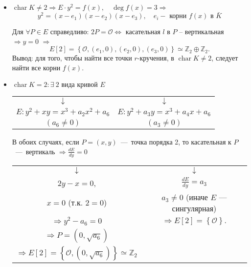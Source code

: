 \documentclass[12pt]{article}
\newcommand{\Z}{{{\mathbb Z}}}
\theoremstyle{definition}
\theoremstyle{definition}
\theoremstyle{definition}
\begin{document}
\begin{itemize}
	\item $\operatorname{char} K \ne 2 \Rightarrow E \cdot {y^2} = f\left( x \right),\quad \deg f\left( x \right) = 3 \Rightarrow $
	$$
	{y^2} = \left( {x - {e_1}} \right)\left( {x - {e_2}} \right)\left( {x - {e_3}} \right),\quad {e_i} - {\text{ корни }}f\left( x \right){\text{ в }}\bar{K}
	$$
	
	Для $\forall P \in E$ справедливо: $2P = \mathcal{O} \Leftrightarrow $ касательная $l$ в $P$ -- вертикальная $ \Rightarrow y = 0$ $ \Rightarrow $
	\[
	E[2] = \left\{ \mathcal{O}, (e_1,0), (e_2,0), (e_3,0) \right\} \simeq \Z_2 \oplus \Z_2.
	\]
	Вывод: для того, чтобы найти все точки $r$-кручения, в $\operatorname{char} K \ne 2$, следует найти все корни $f(x)$.
	\item $\operatorname{char} K = 2: \exists\: 2\text{ вида кривой } E$

    \begin{center}
	\begin{tabular}{c c}
		$ \downarrow $ & $ \downarrow $ \\
		$E: y^2 + xy = x^3 + a_2 x^2 + a_6$ \quad & $E: y^2 + a_3 y = x^3 + a_4 x + a_6$ \\
		$\left( {{a_6} \ne 0} \right)$ & $\left( {{a_3} \ne 0} \right)$ \\
	\end{tabular}
    \end{center}

	В обоих случаях, если $P = \left( {x,y} \right)$~---~точка порядка 2, то касательная к $P$~---~вертикаль $ \Rightarrow \frac{{dE}}{{dy}} = 0$

	\begin{center}
	\begin{tabular}{c c}
		$ \downarrow $ & $ \downarrow $ \\
		$2y - x = 0$, & $\frac{{dE}}{{dy}} = {a_3}$ \\
		$x = 0$ (т.к. $2=0$) & ${a_3} \ne 0$ (иначе $E$ — сингулярная) \\
		$ \Rightarrow y^2 - a_6 = 0$ & $\Rightarrow E[2] = \left\{\mathcal{O}\right\}.$ \\
		$ \Rightarrow P = (0, \sqrt{a_6})$ & \\
		$ \Rightarrow E[2] = \left\{ {\mathcal{O}, (0,\sqrt{a_6})} \right\} \simeq \Z_2$ & \\
	\end{tabular}
	\end{center}
\end{itemize}
\end{document}
